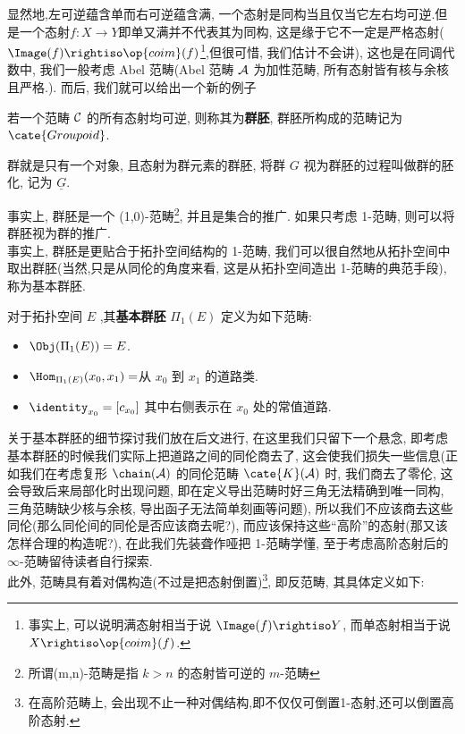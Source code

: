 显然地,左可逆蕴含单而右可逆蕴含满, 一个态射是同构当且仅当它左右均可逆.但是一个态射$f: X \to Y$即单又满并不代表其为同构, 这是缘于它不一定是严格态射($\Image(f)\rightiso \op{coim}(f)$\footnote{事实上, 可以说明满态射相当于说 $\Image(f) \rightiso Y$, 而单态射相当于说 $X \rightiso \op{coim}(f)$.},但很可惜, 我们估计不会讲), 这也是在同调代数中, 我们一般考虑 Abel 范畴(Abel 范畴 $\cal{A}$ 为加性范畴, 所有态射皆有核与余核且严格.).
而后, 我们就可以给出一个新的例子
\begin{definition}[群胚]
    若一个范畴 $\cal{C}$ 的所有态射均可逆, 则称其为\textbf{群胚}, 群胚所构成的范畴记为 $\cate{Groupoid}$.
\end{definition}
\begin{example}
    群就是只有一个对象, 且态射为群元素的群胚, 将群 $G$ 视为群胚的过程叫做群的胚化, 记为 $\underline{G}$.
\end{example}
事实上, 群胚是一个 (1,0)-范畴\footnote{所谓(m,n)-范畴是指 $k>n$ 的态射皆可逆的 $m$-范畴}, 并且是集合的推广. 如果只考虑 1-范畴, 则可以将群胚视为群的推广.\\
事实上, 群胚是更贴合于拓扑空间结构的 1-范畴, 我们可以很自然地从拓扑空间中取出群胚(当然,只是从同伦的角度来看, 这是从拓扑空间造出 1-范畴的典范手段), 称为基本群胚.
\begin{example}\label{基本群胚}
    对于拓扑空间 $E$ ,其\textbf{基本群胚} $\Pi_{1}(E)$ 定义为如下范畴:
    \begin{itemize}
        \item $\Obj(\Pi_1(E)) = E$.
        \item $\Hom_{\Pi_1(E)}(x_0,x_1) = $从 $x_0$ 到 $x_1$ 的道路类.
        \item $\identity_{x_0} = [c_{x_0}]$ 其中右侧表示在 $x_0$ 处的常值道路.
    \end{itemize}
\end{example}
关于基本群胚的细节探讨我们放在后文进行, 在这里我们只留下一个悬念, 即考虑基本群胚的时候我们实际上把道路之间的同伦商去了, 这会使我们损失一些信息(正如我们在考虑复形 $\chain(\cal{A})$ 的同伦范畴 $\cate{K}(\cal{A})$ 时, 我们商去了零伦, 这会导致后来局部化时出现问题, 即在定义导出范畴时好三角无法精确到唯一同构, 三角范畴缺少核与余核, 导出函子无法简单刻画等问题), 所以我们不应该商去这些同伦(那么同伦间的同伦是否应该商去呢?), 而应该保持这些``高阶''的态射(那又该怎样合理的构造呢?), 在此我们先装聋作哑把 1-范畴学懂, 至于考虑高阶态射后的 $\infty$-范畴留待读者自行探索.\\
此外, 范畴具有着对偶构造(不过是把态射倒置)\footnote{在高阶范畴上, 会出现不止一种对偶结构,即不仅仅可倒置1-态射,还可以倒置高阶态射.}, 即反范畴, 其具体定义如下:
